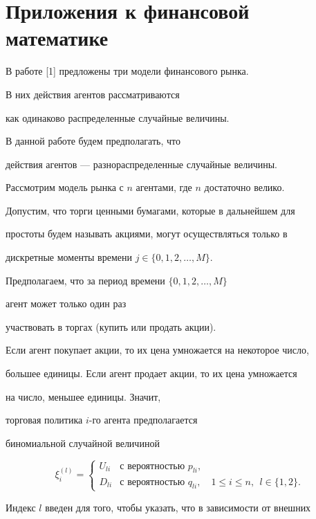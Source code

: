 \section{Приложения к финансовой математике}





В работе [1] предложены три модели финансового рынка. 


В них действия агентов рассматриваются


как одинаково распределенные случайные величины. 


В данной работе будем предполагать, что


действия агентов --- разнораспределенные случайные величины.


Рассмотрим модель рынка с $n$ агентами, где $n$ достаточно велико.


Допустим, что торги ценными бумагами, которые в дальнейшем для 


простоты будем называть акциями, могут осуществляться только в


дискретные моменты времени $j\in\{0, 1,2,\dotsc, M \}$.


Предполагаем, что за период времени $\{0,1,2,\dotsc,M\}$ 


агент может только один раз


участвовать в торгах (купить или продать акции).


Если агент покупает акции, то их цена умножается на некоторое число, 


большее единицы. Если агент продает акции, то их цена умножается 


на число, меньшее единицы. Значит,


торговая политика $i$-го агента предполагается


биномиальной случайной величиной


$$


\xi_{i}^{(l)}=


\begin{cases}


U_{li}&


\text{с вероятностью } p_{li},\\


D_{li}& \text{с вероятностью } q_{li},\quad 1\le i\le n,\ \ l\in\{1,2\}.


\end{cases}


$$


Индекс $l$ введен для того, чтобы указать, что в зависимости от внешних 


